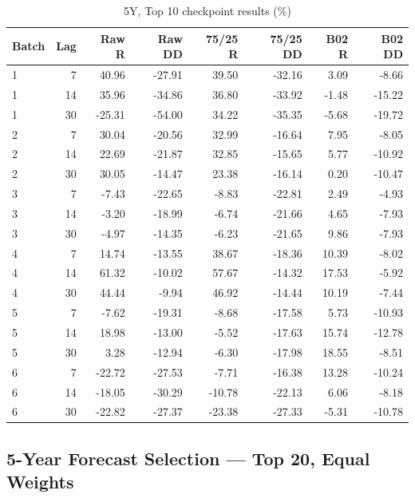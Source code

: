 \documentclass[11pt,a4paper]{article}
\numberwithin{table}{section}
\begin{document}
\begin{minipage}{\linewidth}
\begin{center}\footnotesize\setlength{\tabcolsep}{3pt}\renewcommand{\arraystretch}{1.12}
\begin{longtable}{@{}lrrrrrrr@{}}
\caption{5Y, Top 10 checkpoint results (\%)}\\
\toprule
Batch & Lag & Raw R & Raw DD & 75/25 R & 75/25 DD & B02 R & B02 DD\\\midrule\endhead
1 & 7 & 40.96 & -27.91 & 39.50 & -32.16 & 3.09 & -8.66\\
1 & 14 & 35.96 & -34.86 & 36.80 & -33.92 & -1.48 & -15.22\\
1 & 30 & -25.31 & -54.00 & 34.22 & -35.35 & -5.68 & -19.72\\
2 & 7 & 30.04 & -20.56 & 32.99 & -16.64 & 7.95 & -8.05\\
2 & 14 & 22.69 & -21.87 & 32.85 & -15.65 & 5.77 & -10.92\\
2 & 30 & 30.05 & -14.47 & 23.38 & -16.14 & 0.20 & -10.47\\
3 & 7 & -7.43 & -22.65 & -8.83 & -22.81 & 2.49 & -4.93\\
3 & 14 & -3.20 & -18.99 & -6.74 & -21.66 & 4.65 & -7.93\\
3 & 30 & -4.97 & -14.35 & -6.23 & -21.65 & 9.86 & -7.93\\
4 & 7 & 14.74 & -13.55 & 38.67 & -18.36 & 10.39 & -8.02\\
4 & 14 & 61.32 & -10.02 & 57.67 & -14.32 & 17.53 & -5.92\\
4 & 30 & 44.44 & -9.94 & 46.92 & -14.44 & 10.19 & -7.44\\
5 & 7 & -7.62 & -19.31 & -8.68 & -17.58 & 5.73 & -10.93\\
5 & 14 & 18.98 & -13.00 & -5.52 & -17.63 & 15.74 & -12.78\\
5 & 30 & 3.28 & -12.94 & -6.30 & -17.98 & 18.55 & -8.51\\
6 & 7 & -22.72 & -27.53 & -7.71 & -16.38 & 13.28 & -10.24\\
6 & 14 & -18.05 & -30.29 & -10.78 & -22.13 & 6.06 & -8.18\\
6 & 30 & -22.82 & -27.37 & -23.38 & -27.33 & -5.31 & -10.78\\
\bottomrule\end{longtable}\end{center}
\end{minipage}\par
{}
\subsection{5-Year Forecast Selection --- Top 20, Equal Weights}
\end{document}
